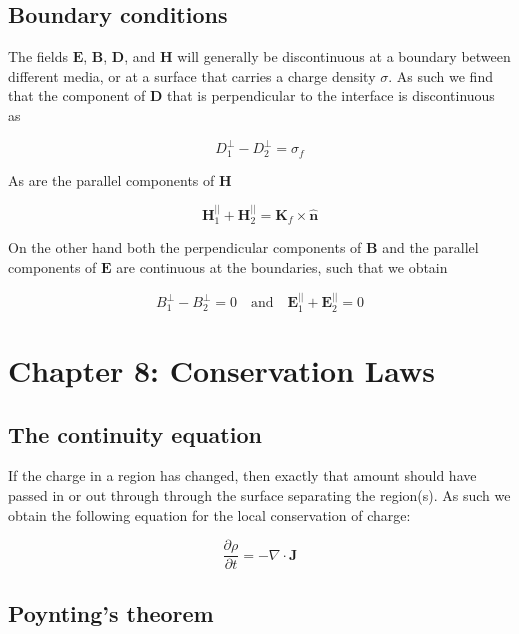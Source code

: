\documentclass[a4paper]{article}
\begin{document}
\subsection{Boundary conditions }

The fields $\bm{E}$, $\bm{B}$, $\bm{D}$, and $\bm{H}$ will generally be discontinuous at a boundary between different media, or at a surface that carries a charge density $\sigma$. As such we find that the component of $\bm{D}$ that is perpendicular to the interface is discontinuous as

\begin{equation}
    D_1^{\perp}-D_2^{\perp}=\sigma_f
\end{equation}

As are the parallel components of $\bm{H}$

\begin{equation}
    \bm{H}_1^{||}+\bm{H}_2^{||}=\bm{K}_f\times\bm{\hat{n}}
\end{equation}

On the other hand both the perpendicular components of $\bm{B}$ and the parallel components of $\bm{E}$ are continuous at the boundaries, such that we obtain

\begin{equation}
    B_1^{\perp}-B_2^{\perp}=0\quad\text{and}\quad \bm{E}_1^{||}+\bm{E}_2^{||}=0
\end{equation}

\section{Chapter 8: Conservation Laws}

\subsection{The continuity equation}

If the charge in a region has changed, then exactly that amount should have passed in or out through through the surface separating the region(s). As such we obtain the following equation for the local conservation of charge: 

\begin{equation}
    \frac{\partial \rho}{\partial t}=-\nabla\cdot\bm{J}
\end{equation}

\subsection{Poynting's theorem}
\end{document}
